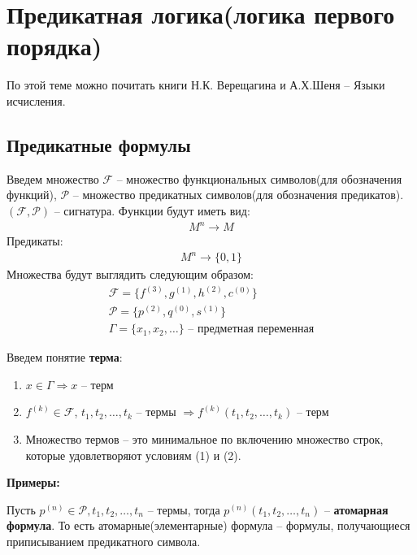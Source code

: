 \section{Предикатная логика(логика первого порядка)}
По этой теме можно почитать книги Н.К. Верещагина и А.Х.Шеня -- Языки исчисления. 
\subsection{Предикатные формулы}
\begin{conj}
    Введем множество $\mathcal{F}$ -- множество функциональных символов(для обозначения функций), $\mathcal{P}$ -- множество предикатных символов(для обозначения предикатов).
    $(\mathcal{F}, \mathcal{P})$ -- сигнатура. 
    Функции будут иметь вид:
    \begin{gather*}
        M^n \longrightarrow M
    \end{gather*} 
    Предикаты:
    \begin{gather*}
        M^n \longrightarrow \{0, 1\} 
    \end{gather*}
    Множества будут выглядить следующим образом:
    \begin{gather*}
        \mathcal{F} = \{f^{(3)}, g^{(1)}, h^{(2)}, c^{(0)}\} \\
        \mathcal{P} = \{p^{(2)}, q^{(0)}, s^{(1)}\} \\
        \Gamma = \{x_1, x_2, \dots\} \text{ -- предметная переменная}
    \end{gather*}
\end{conj}
\begin{conj}
    Введем понятие \textbf{терма}:
    \begin{enumerate}
        \item $x \in \Gamma \Longrightarrow x$ -- терм 
        \item $f^{(k)} \in \mathcal{F}$, $t_1, t_2, \dots, t_k$ -- термы $\Longrightarrow f^{(k)} (t_1, t_2, \dots, t_k)$ -- терм
        \item Множество термов -- это минимальное по включению множество строк, которые удовлетворяют условиям (1) и (2). 
    \end{enumerate}
\end{conj}

\textbf{Примеры:}

\begin{conj}
    Пусть $p^{(n)} \in \mathcal{P}, t_1, t_2, \dots, t_n$ -- термы, тогда 
    $p^{(n)} (t_1, t_2, \dots, t_n)$ -- \textbf{атомарная формула}. То есть атомарные(элементарные) формула -- формулы, получающиеся
    приписыванием предикатного символа.  
\end{conj}

